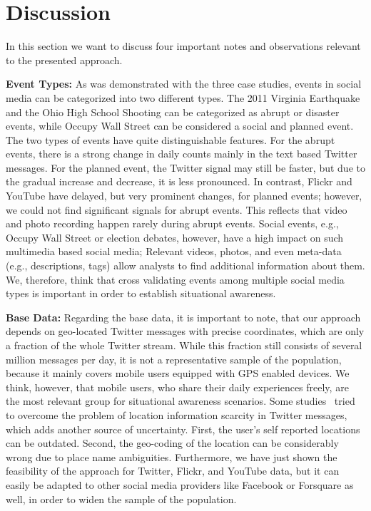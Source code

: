 \section{Discussion}
\label{sec:disc}
In this section we want to discuss four important notes and observations relevant to the presented approach.

\textbf{Event Types:} As was demonstrated with the three case studies, events in social media can be categorized into two different types. 
The 2011 Virginia Earthquake and the Ohio High School Shooting can be categorized as abrupt or disaster events,
while Occupy Wall Street can be considered a social and planned event.
The two types of events have quite distinguishable features.
For the abrupt events, there is a strong change in daily counts mainly in the text based Twitter messages.
For the planned event, the Twitter signal may still be faster, but due to the gradual increase and decrease, it is less pronounced.
In contrast, Flickr and YouTube have delayed, but very prominent changes, for planned events; 
however, we could not find significant signals for abrupt events.
This reflects that video and photo recording happen rarely during abrupt events.
Social events, e.g., Occupy Wall Street or election debates, however, have a high impact on such multimedia based social media; 
Relevant videos, photos, and even meta-data (e.g., descriptions, tags) allow analysts to find additional information about them.
We, therefore, think that cross validating events among multiple social media types is important in order to establish situational awareness.

\textbf{Base Data:} Regarding the base data, it is important to note, that our approach depends on geo-located Twitter messages with precise coordinates, which are only a fraction of the whole Twitter stream.
While this fraction still consists of several million messages per day, 
it is not a representative sample of the population, because it mainly covers mobile users equipped with GPS enabled devices.
We think, however, that mobile users, who share their daily experiences freely, are the most relevant group for situational awareness scenarios.
Some studies~\cite{Cheng:2010:YYT, Jalal:2012:WIT} tried to overcome the problem of location information scarcity in Twitter messages, which adds another source of uncertainty.
First, the user's self reported locations can be outdated.
Second, the geo-coding of the location can be considerably wrong due to place name ambiguities.
Furthermore, we have just shown the feasibility of the approach for Twitter, Flickr, and YouTube data, but it can easily be adapted to other social media providers like Facebook or Forsquare as well, in order to widen the sample of the population.

